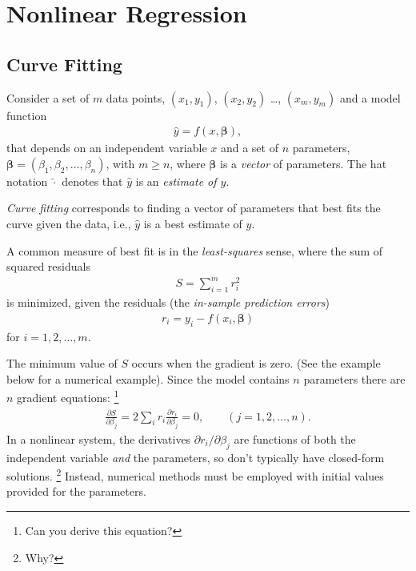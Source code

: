 


\maketitle
\clearpage

\section{Nonlinear Regression}

\subsection{Curve Fitting}

Consider a set of \(m\) data points, \((x_{1},y_{1})\), \((x_{2},y_{2})\)
\ldots, \((x_{m},y_{m})\) and a model function
\begin{align}
\widehat{y} = f\left( x,\boldsymbol{\beta} \right),
\end{align}
that depends on an independent variable \(x\) and a set of \(n\) parameters, 
\(\boldsymbol{\beta} = (\beta_{1},\beta_{2},\ldots,\beta_{n})\),
with \(m \geq n\), 
where \(\boldsymbol{\beta}\) is a \emph{vector} of parameters. 
The hat notation \(\widehat{\cdot}\) denotes that \(\widehat{y}\) is an \emph{estimate of \(y\)}. 

\emph{Curve fitting} corresponds to finding a vector of parameters 
that best fits the curve given the data,
i.e., \(\widehat{y}\) is a best estimate of \(y\).

A common measure of best fit is in the \emph{least-squares} sense, 
where the sum of squared residuals
\begin{align}
S = \sum_{i = 1}^{m}r_{i}^{2}
\end{align}
is minimized, given the residuals (the \emph{in-sample prediction errors})
\begin{align}
r_{i} = y_{i} - f(x_{i},\boldsymbol{\beta})
\end{align}
for \(i = 1,2,\ldots,m\).

The minimum value of \(S\) occurs when the gradient is zero. 
(See the example below for a numerical example). 
Since the model contains \(n\) parameters there are \(n\) gradient equations:%
\footnote{Can you derive this equation?}
\begin{align}
\frac{\partial S}{\partial\beta_{j}} = 
2\sum_{i}^{}r_{i}\frac{\partial r_{i}}{\partial\beta_{j}} = 0,\qquad (j = 1,2,\ldots,n).
\end{align}
In a nonlinear system, 
the derivatives \(\partial r_{i}/\partial\beta_{j}\) are functions of both the
independent variable \emph{and} the parameters, 
so don't typically have closed-form solutions.%
\footnote{Why?} 
Instead, numerical methods must be
employed with initial values provided for the parameters.

